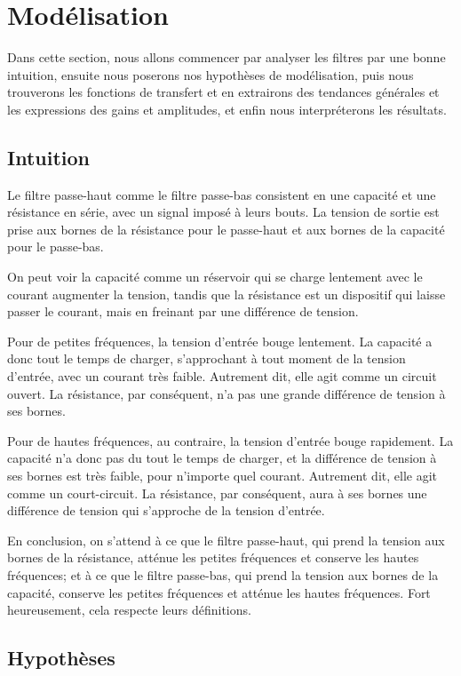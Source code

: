 \section{Modélisation}

Dans cette section, nous allons commencer par analyser les filtres
par une bonne intuition,
ensuite nous poserons nos hypothèses de modélisation,
puis nous trouverons les fonctions de transfert et en extrairons
des tendances générales
et les expressions des gains et amplitudes,
et enfin nous interpréterons les résultats.

\subsection{Intuition}

Le filtre passe-haut comme le filtre passe-bas
consistent en une capacité et une résistance en série,
avec un signal imposé à leurs bouts.
La tension de sortie est prise aux bornes de la résistance pour le passe-haut
et aux bornes de la capacité pour le passe-bas.

On peut voir la capacité comme un réservoir qui se charge lentement avec le
courant augmenter la tension, tandis que la résistance est un dispositif
qui laisse passer le courant, mais en freinant par une différence de tension.

Pour de petites fréquences, la tension d'entrée bouge lentement.
La capacité a donc tout le temps de charger,
s'approchant à tout moment de la tension d'entrée,
avec un courant très faible.
Autrement dit, elle agit comme un circuit ouvert.
La résistance, par conséquent, n'a pas une grande différence
de tension à ses bornes.

Pour de hautes fréquences, au contraire, la tension d'entrée bouge rapidement.
La capacité n'a donc pas du tout le temps de charger,
et la différence de tension à ses bornes est très faible,
pour n'importe quel courant.
Autrement dit, elle agit comme un court-circuit.
La résistance, par conséquent, aura à ses bornes
une différence de tension qui s'approche de la tension d'entrée.

En conclusion, on s'attend à ce que le filtre passe-haut,
qui prend la tension aux bornes de la résistance,
atténue les petites fréquences et conserve les hautes fréquences;
et à ce que le filtre passe-bas,
qui prend la tension aux bornes de la capacité,
conserve les petites fréquences et atténue les hautes fréquences.
Fort heureusement, cela respecte leurs définitions.

\subsection{Hypothèses}

